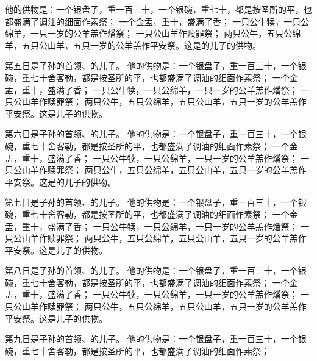 {他的供物是：一个银盘子，重一百三十{}，一个银碗，重七十{}，都是按圣所的平，也都盛满了调油的细面作素祭；
一个金盂，重十{}，盛满了香；
一只公牛犊，一只公绵羊，一只一岁的公羊羔作燔祭；
一只公山羊作赎罪祭；
两只公牛，五只公绵羊，五只公山羊，五只一岁的公羊羔作平安祭。这是{}的儿子{}的供物。
\par }{\PP {}第五日{}是{}子孙的首领、{}的儿子{}。
他的供物是：一个银盘子，重一百三十{}，一个银碗，重七十舍客勒，都是按圣所的平，也都盛满了调油的细面作素祭；
一个金盂，重十{}，盛满了香；
一只公牛犊，一只公绵羊，一只一岁的公羊羔作燔祭；
一只公山羊作赎罪祭；
两只公牛，五只公绵羊，五只公山羊，五只一岁的公羊羔作平安祭。这是{}儿子{}的供物。
\par }{\PP {}第六日{}是{}子孙的首领、{}的儿子{}。
他的供物是：一个银盘子，重一百三十{}，一个银碗，重七十舍客勒，都是按圣所的平，也都盛满了调油的细面作素祭；
一个金盂，重十{}，盛满了香；
一只公牛犊，一只公绵羊，一只一岁的公羊羔作燔祭；
一只公山羊作赎罪祭；
两只公牛，五只公绵羊，五只公山羊，五只一岁的公羊羔作平安祭。这是{}的儿子{}的供物。
\par }{\PP {}第七日{}是{}子孙的首领、{}的儿子{}。
他的供物是：一个银盘子，重一百三十{}，一个银碗，重七十舍客勒，都是按圣所的平，也都盛满了调油的细面作素祭；
一个金盂，重十{}，盛满了香；
一只公牛犊，一只公绵羊，一只一岁的公羊羔作燔祭；
一只公山羊作赎罪祭；
两只公牛，五只公绵羊，五只公山羊，五只一岁的公羊羔作平安祭。这是{}儿子{}的供物。
\par }{\PP {}第八日{}是{}子孙的首领、{}的儿子{}。
他的供物是：一个银盘子，重一百三十{}，一个银碗，重七十舍客勒，都是按圣所的平，也都盛满了调油的细面作素祭；
一个金盂，重十{}，盛满了香；
一只公牛犊，一只公绵羊，一只一岁的公羊羔作燔祭；
一只公山羊作赎罪祭；
两只公牛，五只公绵羊，五只公山羊，五只一岁的公羊羔作平安祭。这是{}儿子{}的供物。
\par }{\PP {}第九日{}是{}子孙的首领、{}的儿子{}。
他的供物是：一个银盘子，重一百三十{}，一个银碗，重七十舍客勒，都是按圣所的平，也都盛满了调油的细面作素祭；
}

